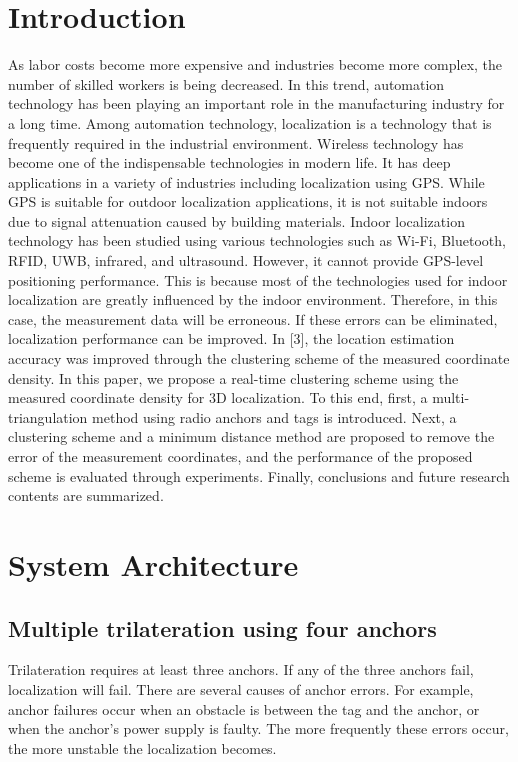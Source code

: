 \documentclass[conference]{IEEEtran}
\begin{document}
\section{Introduction}
As labor costs become more expensive and industries become more complex, the number of skilled workers is being decreased. In this trend, automation technology has been playing an important role in the manufacturing industry for a long time\cite{b1}. Among automation technology, localization is a technology that is frequently required in the industrial environment. Wireless technology has become one of the indispensable technologies in modern life. It has deep applications in a variety of industries including localization using GPS\cite{b2}. While GPS is suitable for outdoor localization applications, it is not suitable indoors due to signal attenuation caused by building materials. Indoor localization technology has been studied using various technologies such as Wi-Fi, Bluetooth, RFID, UWB, infrared, and ultrasound\cite{b3}. However, it cannot provide GPS-level positioning performance. This is because most of the technologies used for indoor localization are greatly influenced by the indoor environment. Therefore, in this case, the measurement data will be erroneous. If these errors can be eliminated, localization performance can be improved. In [3], the location estimation accuracy was improved through the clustering scheme of the measured coordinate density\cite{b4}. In this paper, we propose a real-time clustering scheme using the measured coordinate density for 3D localization. To this end, first, a multi-triangulation method using radio anchors and tags is introduced\cite{b5}. Next, a clustering scheme and a minimum distance method are proposed to remove the error of the measurement coordinates, and the performance of the proposed scheme is evaluated through experiments\cite{b6}. Finally, conclusions and future research contents are summarized\cite{b7}.

\section{System Architecture}

\subsection{Multiple trilateration using four anchors}
Trilateration requires at least three anchors. If any of the three anchors fail, localization will fail. There are several causes of anchor errors. For example, anchor failures occur when an obstacle is between the tag and the anchor, or when the anchor's power supply is faulty. The more frequently these errors occur, the more unstable the localization becomes.
\end{document}
